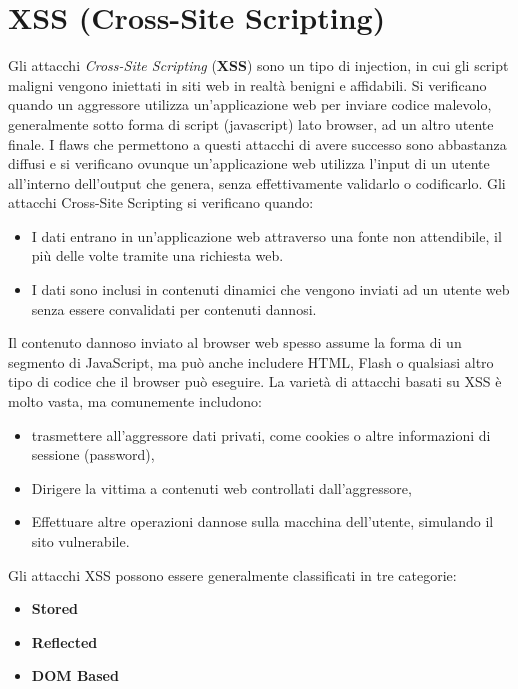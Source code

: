 \chapter{XSS (Cross-Site Scripting)}

Gli attacchi \textit{Cross-Site Scripting} (\textbf{XSS}) sono un tipo di injection, in cui gli
script maligni
vengono iniettati in siti web in realtà benigni e affidabili.
Si verificano quando un aggressore
utilizza un'applicazione web per inviare codice malevolo, generalmente sotto
forma di script
(javascript) lato browser, ad un altro utente finale.
I flaws che permettono a questi attacchi di avere successo sono abbastanza diffusi
e si
verificano ovunque un'applicazione web utilizza l'input di un utente all'interno
dell'output che
genera, senza effettivamente validarlo o codificarlo.
Gli attacchi Cross-Site Scripting si verificano quando:

\begin{itemize}
      \item I dati entrano in un'applicazione web attraverso una fonte non
            attendibile, il più delle
            volte tramite una richiesta web.
      \item I dati sono inclusi in contenuti dinamici che vengono inviati ad un
            utente web senza
            essere convalidati per contenuti dannosi.
\end{itemize}

Il contenuto dannoso inviato al browser web spesso assume la forma di un segmento
di JavaScript, ma può anche includere HTML, Flash o qualsiasi altro tipo di codice
che il browser può eseguire.
La varietà di attacchi basati su XSS è molto vasta, ma comunemente includono:

\begin{itemize}
      \item trasmettere all'aggressore dati privati, come cookies o altre
            informazioni di sessione (password),
      \item Dirigere la vittima a contenuti web controllati dall'aggressore,
      \item Effettuare altre operazioni dannose sulla macchina dell'utente,
            simulando il sito vulnerabile.
\end{itemize}

\newpage

Gli attacchi XSS possono essere generalmente classificati in tre categorie:

\begin{itemize}
      \item \textbf{Stored}
      \item \textbf{Reflected}
      \item \textbf{DOM Based}
\end{itemize}

